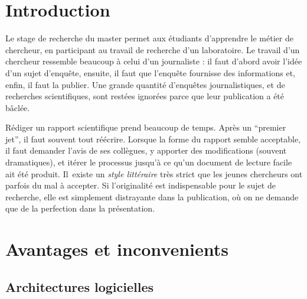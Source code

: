 \documentclass{ipgpmaster}
\begin{document}
\checkyears

\vspace*{5mm}




\def\author{KENFACK NGAHOU Jaures}
\def\title{SYSTÈMES DISTRIBUÉS}
\def\shorttitle{systèmes distribués}
\def\unit{INF4218}
\def\supervisor{Dr  ADAMOU HAMZA \& GBETNKOM NJIFON Jeff }
\def\keywords{Sciences de la Terre,  master, rapport, conseils}

\Entete



\tableofcontents
\newpage

\section{Introduction}

Le stage de recherche du master permet aux étudiants d'apprendre le métier 
de chercheur, en participant au travail de recherche d'un laboratoire. 
Le travail d'un chercheur ressemble beaucoup à celui d'un journaliste : 
il faut d'abord avoir l'idée d'un sujet d'enquête, ensuite, il faut que 
l'enquête fournisse des informations et, enfin, il faut la publier. 
Une grande quantité d'enquêtes journalistiques, et de recherches 
scientifiques, sont restées ignorées parce que leur publication a été 
bâclée.

Rédiger un rapport scientifique prend beaucoup de temps. Après un 
``premier jet'', il faut souvent tout réécrire. 
Lorsque la forme du rapport semble acceptable, il faut demander l'avis 
de ses collègues, y apporter des modifications (souvent dramatiques), 
et itérer le processus
jusqu'à ce qu'un document de lecture facile ait été produit. Il~existe 
un \emph{style littéraire\/} très strict que les jeunes chercheurs ont parfois 
du mal à accepter. Si l'originalité est indispensable pour le sujet de 
recherche, elle est simplement distrayante dans la publication,
où on ne demande que de la perfection dans la pré\-sen\-ta\-tion.


\section{Avantages et inconvenients}


\subsection{Architectures logicielles}
\end{document}
